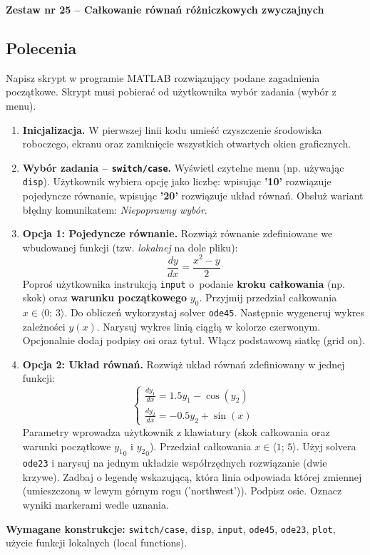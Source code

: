 \documentclass[a4paper,11pt]{article}
\begin{document}
\clearpage
\begin{center}
  {\large\bfseries Zestaw nr 25 \quad -- \quad Całkowanie równań różniczkowych zwyczajnych}
\end{center}
\hrulefill
\vspace{0.4cm}

\subsection*{Polecenia}

Napisz skrypt w programie MATLAB rozwiązujący podane zagadnienia początkowe. Skrypt musi pobierać od użytkownika wybór zadania (wybór z menu).

\begin{enumerate}[leftmargin=*, label=\textbf{\arabic*.}, itemsep=2pt]

  \item \textbf{Inicjalizacja.}
    W pierwszej linii kodu umieść czyszczenie środowiska roboczego, ekranu oraz zamknięcie wszystkich otwartych okien graficznych.

  \item \textbf{Wybór zadania -- \texttt{switch/case}.}
    Wyświetl czytelne menu (np. używając \texttt{disp}). Użytkownik wybiera opcję jako liczbę: wpisując \textbf{'10'} rozwiązuje pojedyncze równanie, wpisując \textbf{'20'} rozwiązuje układ równań. Obsłuż wariant błędny komunikatem: \textit{Niepoprawny wybór}.

  \item \textbf{Opcja 1: Pojedyncze równanie.}
    Rozwiąż równanie zdefiniowane we wbudowanej funkcji (tzw. \textit{lokalnej} na dole pliku):
    \[ \frac{dy}{dx} = \frac{x^2 - y}{2} \]
    Poproś użytkownika instrukcją \texttt{input} o~podanie \textbf{kroku całkowania} (np. skok) oraz \textbf{warunku początkowego} $y_0$. Przyjmij przedział całkowania $x \in \langle 0;\,3 \rangle$.
    Do obliczeń wykorzystaj solver \texttt{ode45}. Następnie wygeneruj wykres zależności $y(x)$. Narysuj wykres linią ciągłą w kolorze czerwonym. Opcjonalnie dodaj podpisy osi oraz tytuł. Włącz podstawową siatkę (grid on).

  \item \textbf{Opcja 2: Układ równań.}
    Rozwiąż układ równań zdefiniowany w jednej funkcji:\\[-0.5em]
    \[
    \begin{cases}
      \frac{dy_1}{dx} = 1.5y_1 - \cos(y_2) \\
      \frac{dy_2}{dx} = -0.5y_2 + \sin(x)
    \end{cases}
    \]
    Parametry wprowadza użytkownik z klawiatury (skok całkowania oraz warunki początkowe $ {y_1}_{0} $ i $ {y_2}_{0} $). Przedział całkowania $x \in \langle 1;\,5 \rangle$.
    Użyj solvera \texttt{ode23} i narysuj na jednym układzie współrzędnych rozwiązanie (dwie krzywe). Zadbaj o legendę wskazującą, która linia odpowiada której zmiennej (umieszczoną w lewym górnym rogu ('northwest')). Podpisz osie. Oznacz wyniki markerami wedle uznania.

\end{enumerate}

\vspace{0.3cm}
\begin{ramka}
\textbf{Wymagane konstrukcje:}
\texttt{switch/case}, \texttt{disp}, \texttt{input}, \texttt{ode45}, \texttt{ode23}, \texttt{plot}, użycie funkcji lokalnych (local functions).
\end{ramka}
\end{document}
